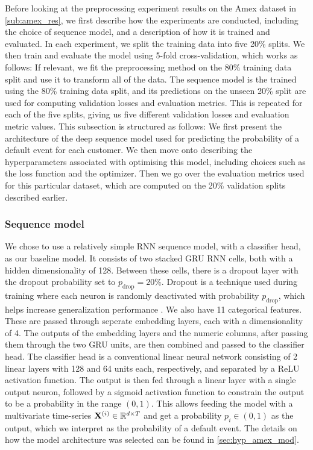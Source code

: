 \documentclass{statsmsc}
\begin{document}
{Before looking at the preprocessing experiment results on the Amex dataset in \cref{sub:amex_res},
we first describe how the experiments are conducted, including the choice of sequence model,
and a description of how it is trained and evaluated. In each experiment, we split the training data into five
20\% splits. We then train and evaluate the model using 5-fold cross-validation, which works
as follows: If relevant, we fit the preprocessing method on the 80\% training data split and use
it to transform all of the data. The sequence model is the trained using the 80\% training data
split, and its predictions on the unseen  20\%  split are used for computing validation losses
and evaluation metrics.
This is repeated for each of the five splits, giving us five different validation losses and
evaluation metric values.
This subsection is structured as follows:
We first present the architecture of the deep sequence model used for predicting the probability of
a default event for each customer. We then move onto describing the hyperparameters associated with
optimising this model, including choices such as the loss function and the optimizer. Then we
go over the evaluation metrics used for this particular dataset, which are computed on the 20\%
validation splits described earlier.


\subsubsection{Sequence model}%
\label{ssub:Sequence model}

We chose to use a relatively simple \ac{RNN} sequence model, with a classifier head, as our
baseline model.
It consists of two stacked \ac{GRU} \ac{RNN} cells, both with a hidden dimensionality of 128.
Between these cells, there is a dropout layer with the dropout probability set to $p_{\textrm{drop}}=20\%$.
Dropout is a technique used during training where each neuron is randomly deactivated with
probability $p_{\textrm{drop}}$, which helps increase generalization performance \citep{dropout}.
We also have 11 categorical features. These are
passed through seperate embedding layers, each with a dimensionality of 4. The outputs of the
embedding layers and the numeric columns, after passing them through the two \ac{GRU} units,
are then combined and passed to the classifier head. The classifier head is a conventional
linear neural network consisting of 2 linear layers with
128 and 64 units each, respectively, and separated by a \ac{ReLU} activation function.
The output is then fed through
a linear layer with a single output neuron, followed by a sigmoid activation function to constrain
the output to be a probability in the range $(0,1)$. This allows feeding the model with
a multivariate time-series $\mathbf{X}^{(i)} \in \mathbb{R}^{d \times T}$ and get a probability
$p_i \in (0,1)$ as the output, which we interpret as the probability of a default event.
The details on how the model architecture was selected can be found in \cref{sec:hyp_amex_mod}.

}
\end{document}
